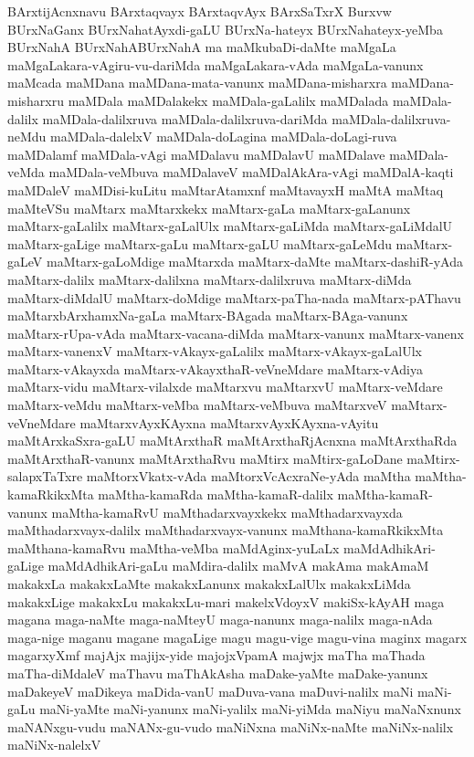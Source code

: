 {BArxtijAcnxnavu
BArxtaqvayx
BArxtaqvAyx
BArxSaTxrX
Burxvw
BUrxNaGanx
BUrxNahatAyxdi-gaLU
BUrxNa-hateyx
BUrxNahateyx-yeMba
BUrxNahA
BUrxNahABUrxNahA
ma
maMkubaDi-daMte
maMgaLa
maMgaLakara-vAgiru-vu-dariMda
maMgaLakara-vAda
maMgaLa-vanunx
maMcada
maMDana
maMDana-mata-vanunx
maMDana-misharxra
maMDana-misharxru
maMDala
maMDalakekx
maMDala-gaLalilx
maMDalada
maMDala-dalilx
maMDala-dalilxruva
maMDala-dalilxruva-dariMda
maMDala-dalilxruva-neMdu
maMDala-dalelxV
maMDala-doLagina
maMDala-doLagi-ruva
maMDalamf
maMDala-vAgi
maMDalavu
maMDalavU
maMDalave
maMDala-veMda
maMDala-veMbuva
maMDalaveV
maMDalAkAra-vAgi
maMDalA-kaqti
maMDaleV
maMDisi-kuLitu
maMtarAtamxnf
maMtavayxH
maMtA
maMtaq
maMteVSu
maMtarx
maMtarxkekx
maMtarx-gaLa
maMtarx-gaLanunx
maMtarx-gaLalilx
maMtarx-gaLalUlx
maMtarx-gaLiMda
maMtarx-gaLiMdalU
maMtarx-gaLige
maMtarx-gaLu
maMtarx-gaLU
maMtarx-gaLeMdu
maMtarx-gaLeV
maMtarx-gaLoMdige
maMtarxda
maMtarx-daMte
maMtarx-dashiR-yAda
maMtarx-dalilx
maMtarx-dalilxna
maMtarx-dalilxruva
maMtarx-diMda
maMtarx-diMdalU
maMtarx-doMdige
maMtarx-paTha-nada
maMtarx-pAThavu
maMtarxbArxhamxNa-gaLa
maMtarx-BAgada
maMtarx-BAga-vanunx
maMtarx-rUpa-vAda
maMtarx-vacana-diMda
maMtarx-vanunx
maMtarx-vanenx
maMtarx-vanenxV
maMtarx-vAkayx-gaLalilx
maMtarx-vAkayx-gaLalUlx
maMtarx-vAkayxda
maMtarx-vAkayxthaR-veVneMdare
maMtarx-vAdiya
maMtarx-vidu
maMtarx-vilalxde
maMtarxvu
maMtarxvU
maMtarx-veMdare
maMtarx-veMdu
maMtarx-veMba
maMtarx-veMbuva
maMtarxveV
maMtarx-veVneMdare
maMtarxvAyxKAyxna
maMtarxvAyxKAyxna-vAyitu
maMtArxkaSxra-gaLU
maMtArxthaR
maMtArxthaRjAcnxna
maMtArxthaRda
maMtArxthaR-vanunx
maMtArxthaRvu
maMtirx
maMtirx-gaLoDane
maMtirx-salapxTaTxre
maMtorxVkatx-vAda
maMtorxVcAcxraNe-yAda
maMtha
maMtha-kamaRkikxMta
maMtha-kamaRda
maMtha-kamaR-dalilx
maMtha-kamaR-vanunx
maMtha-kamaRvU
maMthadarxvayxkekx
maMthadarxvayxda
maMthadarxvayx-dalilx
maMthadarxvayx-vanunx
maMthana-kamaRkikxMta
maMthana-kamaRvu
maMtha-veMba
maMdAginx-yuLaLx
maMdAdhikAri-gaLige
maMdAdhikAri-gaLu
maMdira-dalilx
maMvA
makAma
makAmaM
makakxLa
makakxLaMte
makakxLanunx
makakxLalUlx
makakxLiMda
makakxLige
makakxLu
makakxLu-mari
makelxVdoyxV
makiSx-kAyAH
maga
magana
maga-naMte
maga-naMteyU
maga-nanunx
maga-nalilx
maga-nAda
maga-nige
maganu
magane
magaLige
magu
magu-vige
magu-vina
maginx
magarx
magarxyXmf
majAjx
majijx-yide
majojxVpamA
majwjx
maTha
maThada
maTha-diMdaleV
maThavu
maThAkAsha
maDake-yaMte
maDake-yanunx
maDakeyeV
maDikeya
maDida-vanU
maDuva-vana
maDuvi-nalilx
maNi
maNi-gaLu
maNi-yaMte
maNi-yanunx
maNi-yalilx
maNi-yiMda
maNiyu
maNaNxnunx
maNANxgu-vudu
maNANx-gu-vudo
maNiNxna
maNiNx-naMte
maNiNx-nalilx
maNiNx-nalelxV
}
